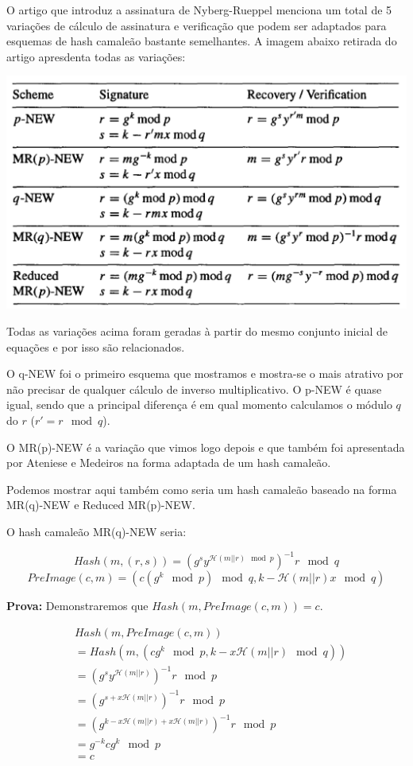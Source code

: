 \documentclass[a4paper]{article}
\begin{document}
O artigo que introduz a assinatura de Nyberg-Rueppel \cite{nyberg}
menciona um total de 5 variações de cálculo de assinatura e
verificação que podem ser adaptados para esquemas de hash camaleão
bastante semelhantes. A imagem abaixo retirada do artigo apresdenta
todas as variações:

\includegraphics[width=\textwidth]{imagens/nyberg.png}

Todas as variações acima foram geradas à partir do mesmo conjunto
inicial de equações e por isso são relacionados.

O q-NEW foi o primeiro esquema que mostramos e mostra-se o mais
atrativo por não precisar de qualquer cálculo de inverso
multiplicativo. O p-NEW é quase igual, sendo que a principal diferença
é em qual momento calculamos o módulo $q$ do $r$ ($r'=r \mod q$).

O MR(p)-NEW é a variação que vimos logo depois e que também foi
apresentada por Ateniese e Medeiros na forma adaptada de um hash
camaleão.

Podemos mostrar aqui também como seria um hash camaleão baseado na
forma MR(q)-NEW e Reduced MR(p)-NEW.

O hash camaleão MR(q)-NEW seria:

$$
Hash(m, (r, s)) = (g^sy^{\mathcal{H}(m||r) \mod p})^{-1}r \mod q
$$
$$
PreImage(c, m) = (c(g^k \mod p) \mod q, k-\mathcal{H}(m||r)x \mod q)
$$

\textbf{Prova: }Demonstraremos que $Hash(m, PreImage(c, m)) = c$.

\begin{equation*}
  \begin{split}
    &Hash(m, PreImage(c, m))\\
    &= Hash(m, (cg^{k} \mod p, k-x\mathcal{H}(m||r) \mod q))\\
    &= (g^sy^{\mathcal{H}(m||r)})^{-1}r \mod p\\
    &= (g^{s+x\mathcal{H}(m||r)})^{-1}r \mod p\\
    &= (g^{k-x\mathcal{H}(m||r)+x\mathcal{H}(m||r)})^{-1}r \mod p\\
    &= g^{-k}cg^{k} \mod p\\
    &= c\\
  \end{split}
\end{equation*}
\end{document}
